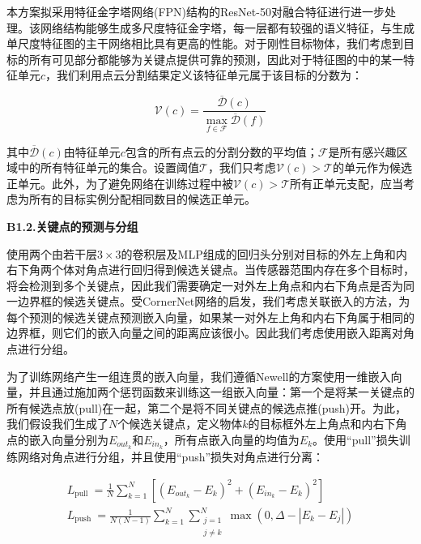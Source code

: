 \documentclass[12pt]{article}
\begin{document}
本方案拟采用特征金字塔网络(FPN)结构的ResNet-50对融合特征进行进一步处理。该网络结构能够生成多尺度特征金字塔，每一层都有较强的语义特征，与生成单尺度特征图的主干网络相比具有更高的性能。对于刚性目标物体，我们考虑到目标的所有可见部分都能够为关键点提供可靠的预测，因此对于特征图的中的某一特征单元$c$，我们利用点云分割结果定义该特征单元属于该目标的分数为：

\begin{equation}
\mathcal{V}(c)=\frac{\overline{\mathcal{D}}(c)}{\max _{f \in \mathcal{F}} \overline{\mathcal{D}}(f)}
\end{equation}

其中$\overline{\mathcal{D}}(c)$由特征单元$c$包含的所有点云的分割分数的平均值；$\mathcal{F}$是所有感兴趣区域中的所有特征单元的集合。设置阈值$\mathcal{T}$，我们只考虑$\mathcal{V}(c)>\mathcal{T}$的单元作为候选正单元。此外，为了避免网络在训练过程中被$\mathcal{V}(c)>\mathcal{T}$所有正单元支配，应当考虑为所有的目标实例分配相同数目的候选正单元。

\textbf{B1.2.关键点的预测与分组}

使用两个由若干层$3 \times 3$的卷积层及MLP组成的回归头分别对目标的外左上角和内右下角两个体对角点进行回归得到候选关键点。当传感器范围内存在多个目标时，将会检测到多个关键点，因此我们需要确定一对外左上角点和内右下角点是否为同一边界框的候选关键点。受CornerNet网络的启发，我们考虑关联嵌入的方法，为每个预测的候选关键点预测嵌入向量，如果某一对外左上角和内右下角属于相同的边界框，则它们的嵌入向量之间的距离应该很小。因此我们考虑使用嵌入距离对角点进行分组。

为了训练网络产生一组连贯的嵌入向量，我们遵循Newell的方案使用一维嵌入向量，并且通过施加两个惩罚函数来训练这一组嵌入向量：第一个是将某一关键点的所有候选点放(pull)在一起，第二个是将不同关键点的候选点推(push)开。为此，我们假设我们生成了$N$个候选关键点，定义物体$k$的目标框外左上角点和内右下角点的嵌入向量分别为$E_{out_k}$和$E_{in_k}$，所有点嵌入向量的均值为$E_k$。使用“pull”损失训练网络对角点进行分组，并且使用“push”损失对角点进行分离：

\begin{equation}
\begin{gathered}
L_{\text {pull }}=\frac{1}{N} \sum_{k=1}^N\left[\left(E_{out_k}-E_k\right)^2+\left(E_{in_k}-E_k\right)^2\right] \\
L_{\text {push }}=\frac{1}{N(N-1)} \sum_{k=1}^N \sum_{\substack{j=1 \\
j \neq k}}^N \max \left(0, \Delta -\left|E_k-E_j\right|\right)
\end{gathered}
\end{equation}
\end{document}
